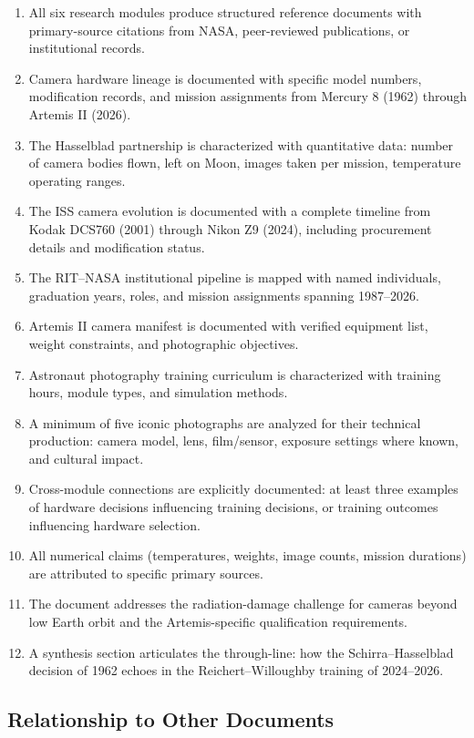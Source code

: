 \documentclass[11pt,letterpaper]{article}
\begin{document}
\begin{enumerate}
  \item All six research modules produce structured reference documents with primary-source citations from NASA, peer-reviewed publications, or institutional records.
  \item Camera hardware lineage is documented with specific model numbers, modification records, and mission assignments from Mercury 8 (1962) through Artemis II (2026).
  \item The Hasselblad partnership is characterized with quantitative data: number of camera bodies flown, left on Moon, images taken per mission, temperature operating ranges.
  \item The ISS camera evolution is documented with a complete timeline from Kodak DCS760 (2001) through Nikon Z9 (2024), including procurement details and modification status.
  \item The RIT--NASA institutional pipeline is mapped with named individuals, graduation years, roles, and mission assignments spanning 1987--2026.
  \item Artemis II camera manifest is documented with verified equipment list, weight constraints, and photographic objectives.
  \item Astronaut photography training curriculum is characterized with training hours, module types, and simulation methods.
  \item A minimum of five iconic photographs are analyzed for their technical production: camera model, lens, film/sensor, exposure settings where known, and cultural impact.
  \item Cross-module connections are explicitly documented: at least three examples of hardware decisions influencing training decisions, or training outcomes influencing hardware selection.
  \item All numerical claims (temperatures, weights, image counts, mission durations) are attributed to specific primary sources.
  \item The document addresses the radiation-damage challenge for cameras beyond low Earth orbit and the Artemis-specific qualification requirements.
  \item A synthesis section articulates the through-line: how the Schirra--Hasselblad decision of 1962 echoes in the Reichert--Willoughby training of 2024--2026.
\end{enumerate}

\subsection{Relationship to Other Documents}
\end{document}
